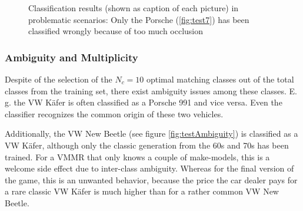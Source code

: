 \begin{figure}[btph]
         \quad
        \caption[Classification results (shown as caption of each picture) in problematic scenarios: Only the Porsche (\ref{fig:test7}) has been classified wrongly because of too much occlusion]{Classification results (shown as caption of each picture) in problematic scenarios: Only the Porsche (\ref{fig:test7}) has been classified wrongly because of too much occlusion}
\label{fig:tests}
\end{figure}

\subsubsection{Ambiguity and Multiplicity}
Despite of the selection of the $N_c = 10$ optimal matching classes out of the total classes from the training set, there exist ambiguity issues among these classes. E. g. the VW K\"afer is often classified as a Porsche 991 and vice versa. Even the classifier recognizes the common origin of these two vehicles.

Additionally, the VW New Beetle (see figure \ref{fig:testAmbiguity}) is classified as a VW K\"afer, although only the classic generation from the 60s and 70s has been trained. For a VMMR that only knows a couple of make-models, this is a welcome side effect due to inter-class ambiguity. Whereas for the final version of the game, this is an unwanted behavior, because the price the car dealer pays for a rare classic VW K\"afer is much higher than for a rather common VW New Beetle.

